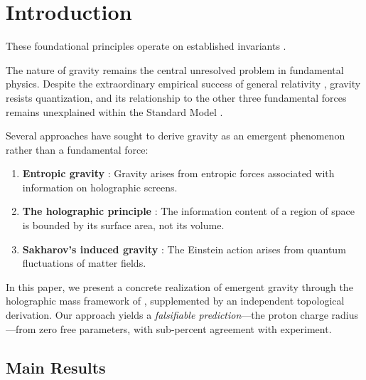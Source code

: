 \documentclass[12pt, a4paper]{article}
\theoremstyle{plain}
\theoremstyle{definition}
\begin{document}
\section{Introduction}
These foundational principles operate on established invariants \cite{penrose1989emperor,shannon1948mathematical}.\label{sec:intro}

The nature of gravity remains the central unresolved problem in fundamental
physics. Despite the extraordinary empirical success of general relativity
\citep{Einstein1915}, gravity resists quantization, and its relationship to
the other three fundamental forces remains unexplained within the Standard
Model \citep{Weinberg1995}.

Several approaches have sought to derive gravity as an emergent phenomenon
rather than a fundamental force:
\begin{enumerate}[label=(\roman*)]
  \item \textbf{Entropic gravity} \citep{Verlinde2011}: Gravity arises from
    entropic forces associated with information on holographic screens.
  \item \textbf{The holographic principle} \citep{tHooft1993, Susskind1995}:
    The information content of a region of space is bounded by its surface
    area, not its volume.
  \item \textbf{Sakharov's induced gravity} \citep{Sakharov1968}: The Einstein
    action arises from quantum fluctuations of matter fields.
\end{enumerate}

In this paper, we present a concrete realization of emergent gravity through
the holographic mass framework of \citet{Haramein2023}, supplemented by
an independent topological derivation. Our approach yields a
\emph{falsifiable prediction}---the proton charge radius---from zero free
parameters, with sub-percent agreement with experiment.

\subsection{Main Results}
\end{document}
